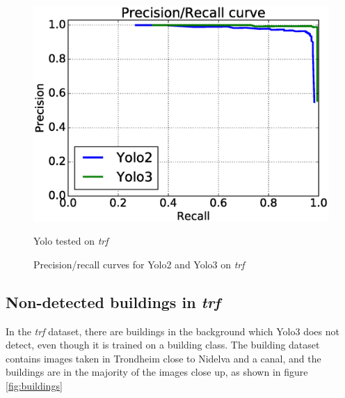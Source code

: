\begin{figure}[h!]
  \centering
  \includegraphics[width=0.8\linewidth]{results/case_buildings/prec_recall/yolo/trf.eps}
  \caption{Yolo tested on \textit{trf}}
  \label{fig:ex_trf_prec_rec_yolo}
\caption{Precision/recall curves for Yolo2 and Yolo3 on \textit{trf}}
\label{fig:yolo_trf_prec}
\end{figure}

\newpage

\subsection{Non-detected buildings in \textit{trf}}
\label{sec:build_trf}
In the \textit{trf} dataset, there are buildings in the background which Yolo3 does not detect, even though it is trained on a building class. The building dataset contains images taken in Trondheim close to Nidelva and a canal, and the buildings are in the majority of the images close up, as shown in figure \ref{fig:buildings}

